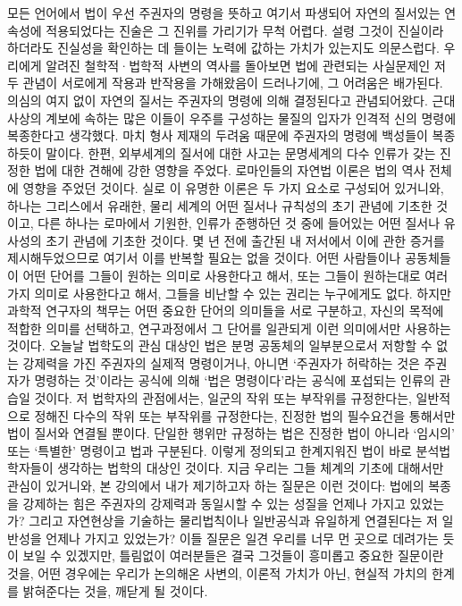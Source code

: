 모든 언어에서 법이 우선 주권자의 명령을 뜻하고
여기서 파생되어 자연의 질서있는 연속성에 적용되었다는 진술은
그 진위를 가리기가 무척 어렵다.
설령 그것이 진실이라 하더라도 진실성을 확인하는 데 들이는
노력에 값하는 가치가 있는지도 의문스럽다.
우리에게 알려진 철학적·법학적 사변의 역사를 돌아보면
법에 관련되는 사실문제인 저 두 관념이 서로에게 작용과 반작용을 가해왔음이
드러나기에, 그 어려움은 배가된다.
의심의 여지 없이
자연의 질서는 주권자의 명령에 의해 결정된다고 관념되어왔다.
근대사상의 계보에 속하는 많은 이들이
우주를 구성하는 물질의 입자가 인격적 신의 명령에 복종한다고 생각했다.
마치 형사 제재의 두려움 때문에 주권자의 명령에 백성들이 복종하듯이 말이다.
한편,
외부세계의 질서에 대한 사고는
문명세계의 다수 인류가 갖는 진정한 법에 대한 견해에 강한 영향을 주었다.
로마인들의 자연법 이론은
법의 역사 전체에 영향을 주었던 것이다.
실로 이 유명한 이론은 두 가지 요소로 구성되어 있거니와,
하나는 그리스에서 유래한,
물리 세계의 어떤 질서나 규칙성의 초기 관념에 기초한 것이고,
다른 하나는 로마에서 기원한,
인류가 준행하던 것 중에 들어있는 어떤 질서나 유사성의 초기 관념에 기초한 것이다.
몇 년 전에 출간된 내 저서에서 이에 관한 증거를 제시해두었으므로
여기서 이를 반복할 필요는 없을 것이다.
어떤 사람들이나 공동체들이 어떤 단어를 그들이 원하는 의미로 사용한다고 해서,
또는 그들이 원하는대로 여러 가지 의미로 사용한다고 해서,
그들을 비난할 수 있는 권리는 누구에게도 없다.
하지만 과학적 연구자의 책무는
어떤 중요한 단어의 의미들을 서로 구분하고,
자신의 목적에 적합한 의미를 선택하고,
연구과정에서 그 단어를 일관되게 이런 의미에서만 사용하는 것이다.
오늘날 법학도의 관심 대상인 법은
분명
공동체의 일부분으로서 저항할 수 없는 강제력을 가진
주권자의 실제적 명령이거나, 아니면
`주권자가 허락하는 것은 주권자가 명령하는 것'이라는 공식에 의해
`법은 명령이다'라는 공식에 포섭되는 인류의 관습일 것이다.
저 법학자의 관점에서는,
일군의 작위 또는 부작위를 규정한다는,
일반적으로 정해진 다수의 작위 또는 부작위를 규정한다는,
진정한 법의 필수요건을 통해서만 법이 질서와 연결될 뿐이다.
단일한 행위만 규정하는 법은 진정한 법이 아니라
`임시의' 또는 `특별한' 명령이고 법과 구분된다.
이렇게 정의되고 한계지워진 법이 바로 분석법학자들이 생각하는
법학의 대상인 것이다.
지금 우리는 그들 체계의 기초에 대해서만 관심이 있거니와,
본 강의에서 내가 제기하고자 하는 질문은 이런 것이다:
법에의 복종을 강제하는 힘은
주권자의 강제력과 동일시할 수 있는 성질을 언제나 가지고 있었는가?
그리고 자연현상을 기술하는 물리법칙이나 일반공식과 유일하게 연결된다는
저 일반성을 언제나 가지고 있었는가?
이들 질문은 일견 우리를 너무 먼 곳으로 데려가는 듯이 보일 수 있겠지만,
틀림없이 여러분들은 결국 그것들이 흥미롭고 중요한 질문이란 것을,
어떤 경우에는 우리가 논의해온 사변의, 이론적 가치가 아닌,
현실적 가치의 한계를 밝혀준다는 것을,
깨닫게 될 것이다.

